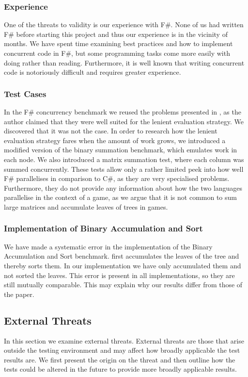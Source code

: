 \subsubsection{Experience}
One of the threats to validity is our experience with F\#. None of us had written F\# before starting this project and thus our experience is in the vicinity of months. We have spent time examining best practices and how to implement concurrent code in F\#, but some programming tasks come more easily with doing rather than reading. Furthermore, it is well known that writing concurrent code is notoriously difficult and requires greater experience\cite{nanz2013benchmarking,nanz2013examining}.

\subsubsection{Test Cases}
In the F\# concurrency benchmark we reused the problems presented in \cite{DBLP:journals/cl/Tremblay-parallel}, as the author claimed that they were well suited for the lenient evaluation strategy. We discovered that it was not the case. In order to research how the lenient evaluation strategy fares when the amount of work grows, we introduced a modified version of the binary summation benchmark, which emulates work in each node. We also introduced a matrix summation test, where each column was summed concurrently. These tests allow only a rather limited peek into how well F\# parallelises in comparison to C\#, as they are very specialised problems. Furthermore, they do not provide any information about how the two languages parallelise in the context of a game, as we argue that it is not common to sum large matrices and accumulate leaves of trees in games.

\subsubsection{Implementation of Binary Accumulation and Sort}
We have made a systematic error in the implementation of the Binary Accumulation and Sort benchmark. \cite{DBLP:journals/cl/Tremblay-parallel} first accumulates the leaves of the tree and thereby sorts them. In our implementation we have only accumulated them and not sorted the leaves. This error is present in all implementations, so they are still mutually comparable. This may explain why our results differ from those of the paper.

\subsection{External Threats}
In this section we examine external threats. External threats are those that arise outside the testing environment and may affect how broadly applicable the test results are. We first present the origin on the threat and then outline how the tests could be altered in the future to provide more broadly applicable results.

